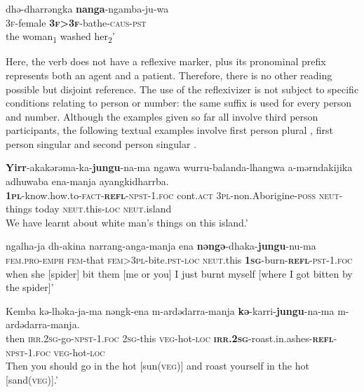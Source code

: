\documentclass[output=paper]{langscibook}
\begin{document}
\ea%
 \label{ex:vanegmond:19}
\gll dhə-dharrəngka \textbf{nanga}-ngamba-ju-wa\\
\textsc{3f}-female \textbf{\textsc{3f>3f}}-bathe-\textsc{caus}-\textsc{pst}\\
\glt the woman\textsubscript{1} washed her\textsubscript{2}’
\z



Here, the verb does not have a reflexive marker, plus its pronominal prefix represents both an agent and a patient. Therefore, there is no other reading possible but disjoint reference.
The use of the reflexivizer is not subject to specific conditions relating to person or number: the same suffix is used for every person and number. Although the examples given so far all involve third person participants, the following textual examples involve first person plural , first person singular  and second person singular .

\ea%
 \label{ex:vanegmond:20}

 \ea
 \label{ex:vanegmond:20a}
\gll \textbf{Yirr}-akakərəma-ka-\textbf{jungu}-na-ma ngawa wurru-balanda-lhangwa a-mərndakijika adhuwaba ena-manja ayangkidharrba.\\
\textbf{\textsc{1pl}}-know.how.to-\textsc{fact}-\textbf{\textsc{refl}}-\textsc{npst}-1.\textsc{foc} cont.\textsc{act} \textsc{3pl}-non.Aborigine-\textsc{poss} \textsc{neut}-things today \textsc{neut}.this-\textsc{loc} \textsc{neut}.island\\
\glt We have learnt about white man’s things on this island.’

 \ex
 \label{ex:vanegmond:20b}
\gll ngalha-ja dh-akina narrang-anga-manja ena \textbf{nəngə}-dhaka-\textbf{jungu}-nu-ma\\
\textsc{fem}.\textsc{pro}-\textsc{emph} \textsc{fem}-that \textsc{fem}>\textsc{3pl}-bite.\textsc{pst}-\textsc{loc} \textsc{neut}.this \textbf{\textsc{1sg}}-burn-\textbf{\textsc{refl}}-\textsc{pst}-1.\textsc{foc}\\
\glt when she [spider] bit them [me or you] I just burnt myself [where I got bitten by the spider]’

\ex
 \label{ex:vanegmond:20c}
\gll Kemba kə-lhəka-ja-ma nəngk-ena m-ardədarra-manja \textbf{kə}{-karri-}\textbf{jungu}-na-ma m-ardədarra-manja.\\
then \textsc{irr}.\textsc{2sg}-go-\textsc{npst}-1.\textsc{foc} \textsc{2sg}-this \textsc{veg}-hot-\textsc{loc} \textbf{\textsc{irr.2sg}}-roast.in.ashes-\textbf{\textsc{refl}}-\textsc{npst}-1.\textsc{foc} \textsc{veg}-hot-\textsc{loc}\\
\glt Then you should go in the hot [sun(\textsc{veg})] and roast yourself in the hot [sand(\textsc{veg})].’
\z
\z
\end{document}

